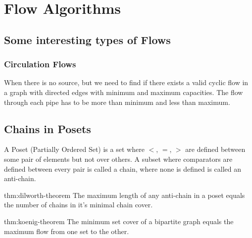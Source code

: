 \chapter{Flow Algorithms}



\section{Some interesting types of Flows}

\subsection{Circulation Flows}

When there is no source, but we need to find if there exists a valid cyclic flow in a graph with directed edges with minimum and maximum capacities. The flow through each pipe has to be more than minimum and less than maximum.



\section{Chains in Posets}

A Poset (Partially Ordered Set) is a set where $<$, $=$, $>$ are defined between some pair of elements but not over others. A subset where comparators are defined between every pair is called a chain, where none is defined is called an anti-chain.

\begin{theorem}{thm:dilworth-theorem}
    The maximum length of any anti-chain in a poset equals the number of chains in it's minimal chain cover.
\end{theorem}

\begin{theorem}{thm:koenig-theorem}
    The minimum set cover of a bipartite graph equals the maximum flow from one set to the other.
\end{theorem}
